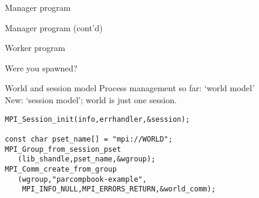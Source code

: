 \begin{numberedframe}{Manager program}
  \footnotesize
\end{numberedframe}

\begin{numberedframe}{Manager program (cont'd)}
  \footnotesize
\end{numberedframe}

\begin{numberedframe}{Worker program}
\end{numberedframe}

\begin{numberedframe}{Were you spawned?}
\end{numberedframe}


\begin{numberedframe}{World and session model}
  Process management so far: `world model'\\
  New: `session model'; world is just one session.
\begin{lstlisting}
MPI_Session_init(info,errhandler,&session);

const char pset_name[] = "mpi://WORLD";
MPI_Group_from_session_pset
   (lib_shandle,pset_name,&wgroup);
MPI_Comm_create_from_group
   (wgroup,"parcompbook-example",
    MPI_INFO_NULL,MPI_ERRORS_RETURN,&world_comm);
\end{lstlisting}
\end{numberedframe}

\endinput

\begin{numberedframe}{}
\begin{lstlisting}
\end{lstlisting}
\end{numberedframe}

